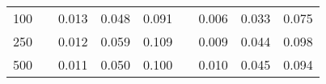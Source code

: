 % 
\begin{tabular}{ccccccccc}
  \hline
  \hline
100 &  & 0.013 & 0.048 & 0.091 &  & 0.006 & 0.033 & 0.075 \\ 
  250 &  & 0.012 & 0.059 & 0.109 &  & 0.009 & 0.044 & 0.098 \\ 
  500 &  & 0.011 & 0.050 & 0.100 &  & 0.010 & 0.045 & 0.094 \\ 
   \hline
\end{tabular}

